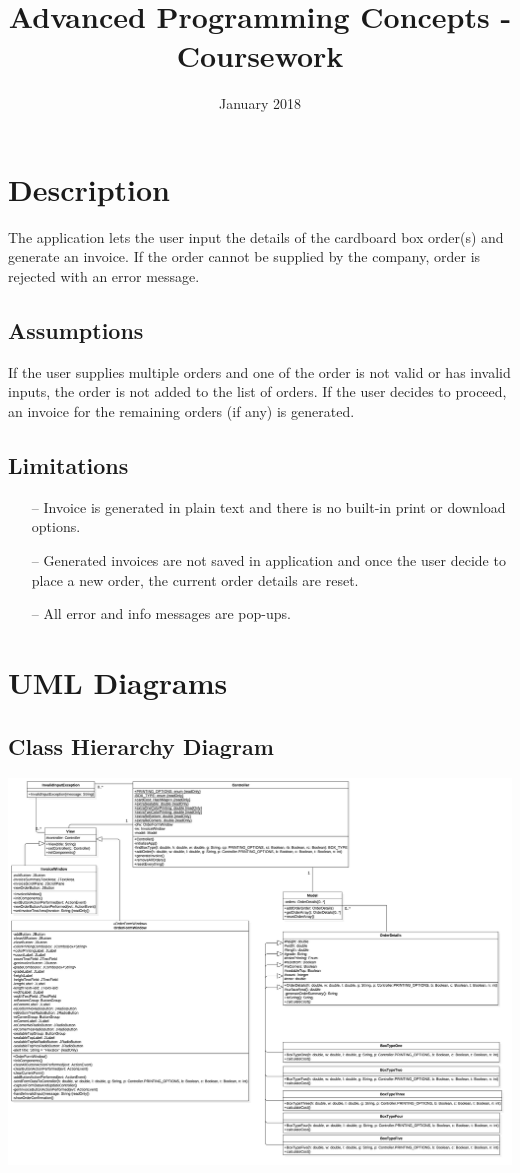 \documentclass[12pt]{article}
\title{Advanced Programming Concepts - Coursework}
\date{January 2018} %
\begin{document}
\maketitle
\newpage
\tableofcontents
\newpage

\section{Description}
The application lets the user input the details of the cardboard box order(s) and generate an invoice. If the order cannot be supplied by the company, order is rejected with an error message.

\subsection{Assumptions}
If the user supplies multiple orders and one of the order is not valid or has invalid inputs, the order is not added to the list of orders. If the user decides to proceed, an invoice for the remaining orders (if any) is generated.

\subsection{Limitations}
\begin{enumerate}
	\item[--] Invoice is generated in plain text and there is no built-in print or download options. 
	\item [--] Generated invoices are not saved in application and once the user decide to place a new order, the current order details are reset.
	\item[--] All error and info messages are pop-ups.
\end{enumerate}
\newpage
\section{UML Diagrams}
\subsection{Class Hierarchy Diagram}
\includegraphics[scale=0.13]{./diagrams/ClassHierarchyDiagram.jpg}
\end{document}
